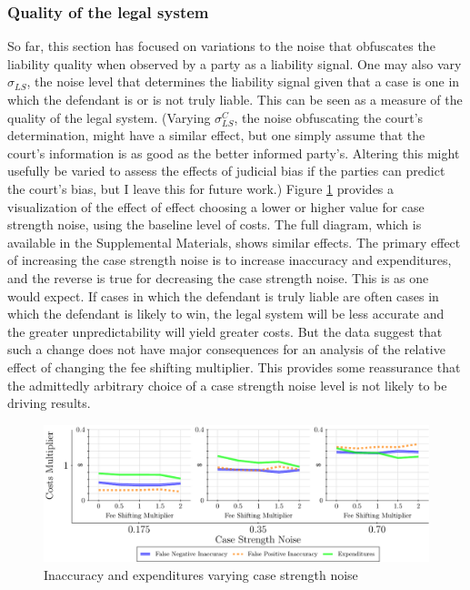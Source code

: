 \documentclass{article}
\begin{document}
\subsubsection{Quality of the legal system}

So far, this section has focused on variations to the noise that obfuscates the liability quality when observed by a party as a liability signal. One may also vary $\sigma_{LS}$, the noise level that determines the liability signal given that a case is one in which the defendant is or is not truly liable. This can be seen as a measure of the quality of the legal system. (Varying $\sigma_{LS}^C$, the noise obfuscating the court's determination, might have a similar effect, but one simply assume that the court's information is as good as the better informed party's. Altering this might usefully be varied to assess the effects of judicial bias if the parties can predict the court's bias, but I leave this for future work.)  Figure \ref{fig:accexp_qualitylegalsystem} provides a visualization of the effect of effect choosing a lower or higher value for case strength noise, using the baseline level of costs. The full diagram, which is available in the Supplemental Materials, shows similar effects. The primary effect of increasing the case strength noise is to increase inaccuracy and expenditures, and the reverse is true for decreasing the case strength noise. This is as one would expect. If cases in which the defendant is truly liable are often cases in which the defendant is likely to win, the legal system will be less accurate and the greater unpredictability will yield greater costs. But the data suggest that such a change does not have major consequences for an analysis of the relative effect of changing the fee shifting multiplier. This provides some reassurance that the admittedly arbitrary choice of a case strength noise level is not likely to be driving results.

\begin{figure}[h!]
\centering
\includegraphics[scale=0.50, trim={0in 0in 0in 0in}, clip]{../Figures/Accuracy and Expenditures Varying Case Strength Noise Costs 1.pdf}
\caption{Inaccuracy and expenditures varying case strength noise}
\label{fig:accexp_qualitylegalsystem}
\end{figure}
\end{document}
